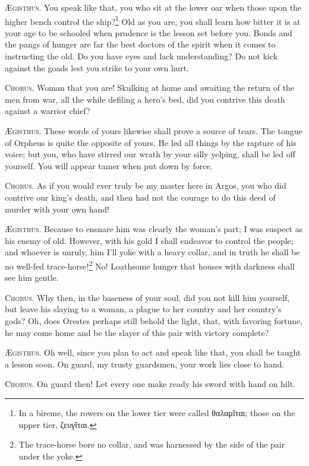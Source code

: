 \documentclass[12pt]{article}
\begin{document}
\textsc{{\AE}gisthus.} You speak like that, you who sit at the lower oar when those upon the higher bench control the ship?\footnote{In a bireme, the rowers on the lower tier were called θαλαμῖται; those on the upper tier, ζευγῖται.} Old as you are, you shall learn how bitter it is at your age to be schooled when prudence is the lesson set before you. Bonds and the pangs of hunger are far the best doctors of the spirit when it comes to instructing the old. Do you have eyes and lack understanding? Do not kick against the goads lest you strike to your own hurt.

\textsc{Chorus.} Woman that you are! Skulking at home and awaiting the return of the men from war, all the while defiling a hero's bed, did you contrive this death against a warrior chief?

\textsc{{\AE}gisthus.} These words of yours likewise shall prove a source of tears. The tongue of Orpheus is quite the opposite of yours. He led all things by the rapture of his voice; but you, who have stirred our wrath by your silly yelping, shall be led off yourself. You will appear tamer when put down by force.

\textsc{Chorus.} As if you would ever truly be my master here in Argos, you who did contrive our king's death, and then had not the courage to do this deed of murder with your own hand!

\textsc{{\AE}gisthus.} Because to ensnare him was clearly the woman's part; I was suspect as his enemy of old. However, with his gold I shall endeavor to control the people; and whoever is unruly, him I'll yoke with a heavy collar, and in truth he shall be no well-fed trace-horse!\footnote{The trace-horse bore no collar, and was harnessed by the side of the pair under the yoke.} No! Loathsome hunger that houses with darkness shall see him gentle.

\textsc{Chorus.} Why then, in the baseness of your soul, did you not kill him yourself, but leave his slaying to a woman, a plague to her country and her country's gods? Oh, does Orestes perhaps still behold the light, that, with favoring fortune, he may come home and be the slayer of this pair with victory complete?

\textsc{{\AE}gisthus.} Oh well, since you plan to act and speak like that, you shall be taught a lesson soon. On guard, my trusty guardsmen, your work lies close to hand.

\textsc{Chorus.} On guard then! Let every one make ready his sword with hand on hilt.
\end{document}
